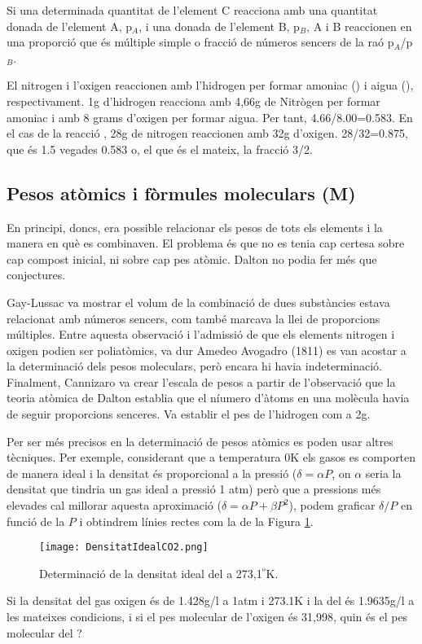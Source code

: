 \begin{mdframed}[backgroundcolor=gray!30,frametitle=Llei de les proporcions equivalents]
Si una determinada quantitat de l'element C reacciona amb una quantitat donada de l'element A, p$_A$, i una donada de l'element B, p$_B$, A i B reaccionen en una proporció que és múltiple simple o fracció de números sencers de la raó p$_A$/p$_B$.
\end{mdframed}

El nitrogen i l'oxigen reaccionen amb l'hidrogen per formar amoniac () i aigua (), respectivament. 1g d'hidrogen reacciona amb 4,66g de Nitrògen per formar amoniac i amb 8 grams d'oxigen per formar aigua. Per tant, 4.66/8.00=0.583.
En el cas de la reacció , 28g de nitrogen reaccionen amb 32g d'oxigen. 28/32=0.875, que és 1.5 vegades 0.583 o, el que és el mateix, la fracció 3/2.



\subsection{Pesos atòmics i fòrmules moleculars (M)}

En principi, doncs, era possible relacionar els pesos de tots els elements i la manera en què es combinaven. El problema és que no es tenia cap certesa sobre cap compost inicial, ni sobre cap pes atòmic. Dalton no podia fer més que conjectures.

Gay-Lussac va mostrar el volum de la combinació de dues substàncies estava relacionat amb números sencers, com també marcava la llei de proporcions múltiples. Entre aquesta observació i l'admissió de que els elements nitrogen i oxigen podien ser poliatòmics, va dur Amedeo Avogadro (1811) es van acostar a la determinació dels pesos moleculars, però encara hi havia indeterminació. Finalment, Cannizaro va crear l'escala de pesos a partir de l'observació que la teoria atòmica de Dalton establia que el níumero d'àtoms en una molècula havia de seguir proporcions senceres. Va establir el pes de l'hidrogen com a 2g.

Per ser més precisos en la determinació de pesos atòmics es poden usar altres tècniques. Per exemple, considerant que a temperatura 0K els gasos es comporten de manera ideal i la densitat és proporcional a la pressió ($\delta=\alpha P$, on $\alpha$ seria la densitat que tindria un gas ideal a pressió 1 atm) però que a pressions més elevades cal millorar aquesta aproximació ($\delta = \alpha P + \beta P^2$), podem graficar $\delta/P$ en funció de la $P$ i obtindrem línies rectes com la de la Figura \ref{fig:DensitatIdealCO2}.
\begin{figure}[h]
\centering
\texttt{[image: DensitatIdealCO2.png]}
\caption{Determinació de la densitat ideal del  a 273,1$^º$K.}
\label{fig:DensitatIdealCO2}
\end{figure}
\begin{exr}
Si la densitat del gas oxigen és de 1.428g/l a 1atm i 273.1K i la del  és 1.9635g/l a les mateixes condicions, i si el pes molecular de l'oxigen és 31,998, quin és el pes molecular del ?
\end{exr}


